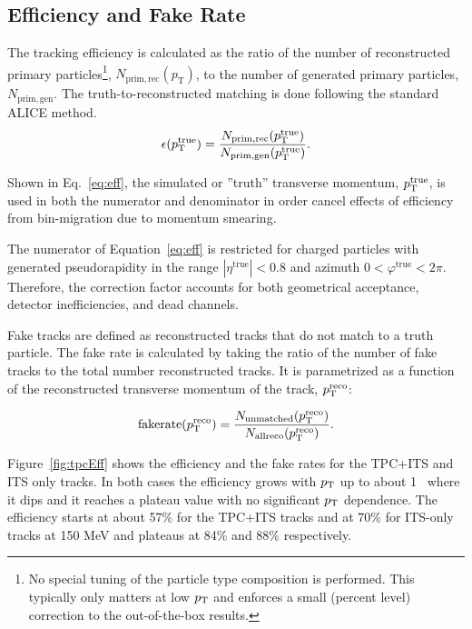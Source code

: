 \subsection{Efficiency and Fake Rate}
\label{sec:Efficiency_fake_rates}
The tracking efficiency is calculated as the ratio of the number of reconstructed primary particles\footnote{No special tuning of the particle type composition is performed. This typically only matters at low $p_{\mathrm{T}}$ and enforces a small (percent level) correction to the out-of-the-box results.}, $N_{\mathrm{prim,rec}}(p_\mathrm{T})$, to the number of generated primary particles, $N_{\mathrm{prim,gen}}$. The truth-to-reconstructed matching is done following the standard ALICE method.
\begin{equation}\label{eq:eff}
\epsilon (p_{\mathrm{T}}^{\mathrm{true}}) = \frac{N_{\mathrm{prim,rec}}(p_{\mathrm{T}}^{\mathrm{true}})}{N_{\mathrm{prim,gen}}(p_{\mathrm{T}}^{\mathrm{true}})}.
\end{equation}

Shown in Eq.~\ref{eq:eff}, the simulated or ''truth'' transverse momentum, $p_{\mathrm{T}}^{\mathrm{true}}$, is used in both the numerator and denominator in order cancel effects of efficiency from bin-migration due to momentum smearing.

The numerator of Equation~\ref{eq:eff} is restricted for charged particles with generated pseudorapidity in the range $|\eta^{\mathrm{true}}|<0.8$ and azimuth $0<\varphi^{\mathrm{true}}<2\pi$. Therefore, the correction factor accounts for both geometrical acceptance, detector inefficiencies, and dead channels.  

Fake tracks are defined as reconstructed tracks that do not match to a truth particle. The fake rate is calculated by taking the ratio of the number of fake tracks to the total number reconstructed tracks. It is parametrized as a function of the reconstructed transverse momentum of the track, $p_{\mathrm{T}}^{\mathrm{reco}}$:

\begin{equation}\label{eq:fakes}
\mathrm{fake rate} (p_{\mathrm{T}}^{\mathrm{reco}}) = \frac{N_{\mathrm{unmatched}}(p_{\mathrm{T}}^{\mathrm{reco}})}{N_{\mathrm{all reco}}(p_{\mathrm{T}}^{\mathrm{reco}})}.
\end{equation}

Figure~\ref{fig:tpcEff} shows the efficiency and the fake rates for the TPC+ITS and ITS only tracks. In both cases the efficiency grows with $p_{\mathrm{T}}$ up to about 1 \GeVc~where it dips and it reaches a plateau value with no significant $p_{\mathrm{T}}$ dependence. The efficiency starts at about 57$\%$ for the TPC+ITS tracks and at 70$\%$ for ITS-only tracks at 150 MeV and plateaus at 84\% and 88\% respectively. %

